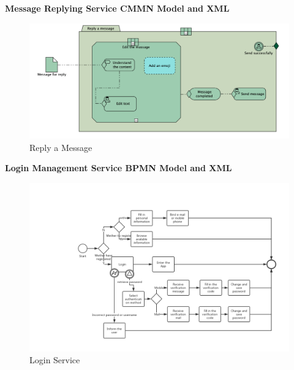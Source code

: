 \documentclass[runningheads]{llncs}
\begin{document}
\textbf{Message Replying Service CMMN Model and XML}
\begin{figure}
  \centering
  \includegraphics[width=1\textwidth]{figure/pmz/interactioncmmn}
  \caption{Reply a Message}
\end{figure}
	
	
    \textbf{Login Management Service BPMN Model and XML}\\

    \begin{figure}
       \centering %
       \includegraphics[width=1.0\textwidth]{figure/hyy/loginmanagement} %
       \caption{Login Service} %
       \label{Login Service} %
   \end{figure}
\end{document}
